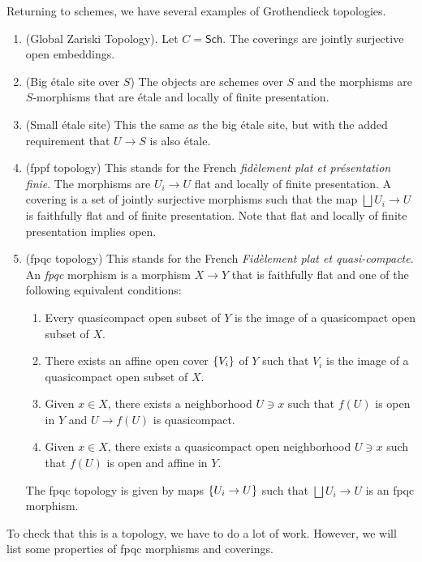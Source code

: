\documentclass[leqno, openany]{memoir}
\theoremstyle{definition}
\theoremstyle{remark}
\theoremstyle{plain}
\theoremstyle{definition}
\theoremstyle{remark}
\newcommand{\ms}[1]{\mathsf{#1}}
\begin{document}
Returning to schemes, we have several examples of Grothendieck topologies.
\begin{enumerate} \item (Global Zariski Topology). Let $C = \ms{Sch}$. The
    coverings are jointly surjective open embeddings.  \item (Big \'etale site
    over $S$) The objects are schemes over $S$ and the morphisms are
    $S$-morphisms that are \'etale and locally of finite presentation.  \item
    (Small \'etale site) This the same as the big \'etale site, but with the
    added requirement that $U \to S$ is also \'etale.  \item (fppf topology)
    This stands for the French \textit{fid\`element plat et pr\'esentation
    finie}. The morphisms are $U_i \to U$ flat and locally of finite
    presentation. A covering is a set of jointly surjective morphisms such that
    the map $\bigsqcup U_i \to U$ is faithfully flat and of finite
    presentation. Note that flat and locally of finite presentation implies
    open.  \item (fpqc topology) This stands for the French
    \textit{Fid\`element plat et quasi-compacte}. An \textit{fpqc} morphism is
    a morphism $X \to Y$ that is faithfully flat and one of the following
    equivalent conditions: \begin{enumerate} \item Every quasicompact open
        subset of $Y$ is the image of a quasicompact open subset of $X$.  \item
        There exists an affine open cover $\qty{V_i}$ of $Y$ such that $V_i$ is
        the image of a quasicompact open subset of $X$.  \item Given $x \in X$,
        there exists a neighborhood $U \ni x$ such that $f(U)$ is open in $Y$
        and $U \to f(U)$ is quasicompact.  \item Given $x \in X$, there exists
        a quasicompact open neighborhood $U \ni x$ such that $f(U)$ is open and
        affine in $Y$.  \end{enumerate} The fpqc topology is given by maps
$\qty{U_i \to U}$ such that $\bigsqcup U_i \to U$ is an fpqc morphism.
\end{enumerate}

To check that this is a topology, we have to do a lot of work. However, we will
list some properties of fpqc morphisms and coverings.
\end{document}
